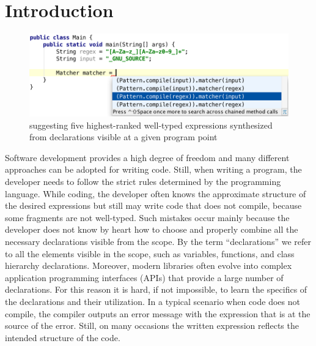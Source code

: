 \section{Introduction}
\label{sec:intro}

\begin{figure}[!tbh]
\includegraphics[natwidth=\textwidth]{RegexMatcher.png}
\caption{{\ourTool} suggesting five highest-ranked 
well-typed expressions synthesized from declarations visible at a given program point\label{screenshot}}
\end{figure}


Software development provides a high degree of freedom and
many different approaches can be adopted for writing
code. Still, when writing a program, the developer needs to follow
the strict rules determined by the programming language. While coding, the developer often knows the
approximate structure of the desired expressions but still may write code
that does not compile, because some fragments are not well-typed.
Such mistakes occur mainly because the developer does not
know by heart how to choose and properly combine all the necessary
declarations visible from the scope. By the term ``declarations'' 
we refer to all the elements visible in the scope, such as variables, functions, and class
hierarchy declarations. Moreover, modern libraries often evolve into complex 
application programming interfaces (APIs) that provide
a large number of declarations. For this reason 
it is hard, if not impossible, to learn the specifics of
the declarations and their utilization. In a typical scenario when code does not compile, the compiler outputs
an error message with the expression that is at the source of the
error. Still, on many occasions the written expression reflects the
intended structure of the code. 

